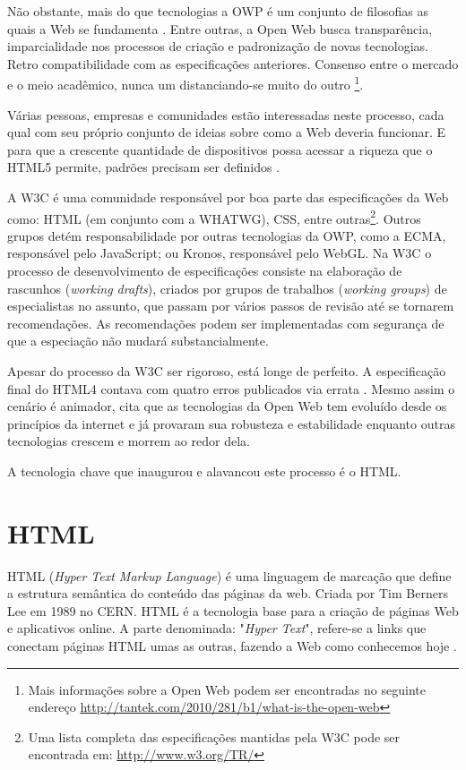 Não obstante, mais do que tecnologias a OWP é um conjunto de
filosofias as quais a Web se fundamenta \autocite{openWebDefinition}.
Entre outras, a Open Web busca transparência, imparcialidade nos
processos de criação e padronização de novas tecnologias.
Retro compatibilidade com as especificações anteriores.
Consenso entre o mercado e o meio acadêmico, nunca um
distanciando-se muito do outro \footnote{Mais informações
sobre a Open Web podem ser encontradas no seguinte endereço
\url{http://tantek.com/2010/281/b1/what-is-the-open-web}}.

Várias pessoas, empresas e comunidades estão interessadas neste
processo, cada qual com seu próprio conjunto de ideias sobre como
a Web deveria funcionar. E para que a crescente quantidade de
dispositivos possa acessar a riqueza que o HTML5 permite, padrões
precisam ser definidos \autocite[p. 5]{aSeriousContender}.

A W3C é uma comunidade responsável por boa parte das especificações
da Web como: HTML (em conjunto com a WHATWG), CSS, entre
outras\footnote{Uma lista completa das especificações mantidas pela
W3C pode ser encontrada em: \url{http://www.w3.org/TR/}}. Outros grupos
detém responsabilidade por outras tecnologias da OWP, como a ECMA,
responsável pelo JavaScript; ou Kronos, responsável pelo WebGL. Na
W3C o processo de desenvolvimento de especificações consiste na
elaboração de rascunhos (\textit{working drafts}), criados por grupos
de trabalhos (\textit{working groups}) de especialistas no assunto, que
passam por vários passos de revisão até se tornarem recomendações.
As recomendações podem ser implementadas com segurança de que a
especiação não mudará substancialmente.

Apesar do processo da W3C ser rigoroso, está longe de perfeito. A
especificação final do HTML4 contava com quatro erros publicados
via errata \autocite{diveIntohtml}. Mesmo assim o cenário é animador,
\citet{html5mostwanted} cita que as tecnologias da Open Web tem
evoluído desde os princípios da internet e já provaram sua robusteza
e estabilidade enquanto outras tecnologias crescem e morrem ao redor
dela.

A tecnologia chave que inaugurou e alavancou este processo é o HTML.
\section{HTML}

HTML (\textit{Hyper Text Markup Language}) é uma linguagem de
marcação que define a estrutura semântica do conteúdo das páginas
da web. Criada por Tim Berners Lee em 1989 no CERN. HTML é a tecnologia
base para a criação de páginas Web e aplicativos online. A parte
denominada: "\textit{Hyper Text}", refere-se a links que conectam
páginas HTML umas as outras, fazendo a Web como conhecemos hoje
\autocite{mdn2015}.

